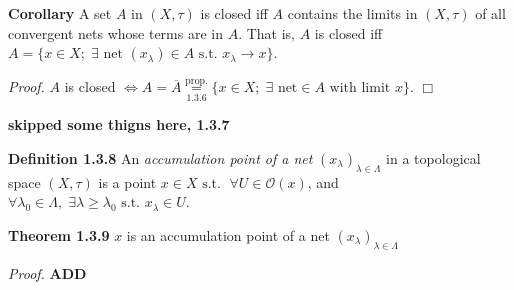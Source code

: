 \documentclass[12pt]{article}
\newcommand{\st}[0]{ \textrm{ s.t. } }
\newcommand{\lrimply}[0] { \Leftrightarrow }
\newcommand{\rarw}[0] { \rightarrow }
\newcommand{\lam}[0] {  \lambda }
\newcommand{\Lam}[0] {  \Lambda }
\newcommand{\curlyO}[0] { \mathcal{O} }
\begin{document}
\begin{flushleft} {\bf Corollary} A set $A$ in $(X, \tau)$ is closed iff $A$ contains the limits in $(X, \tau)$ of all convergent nets whose terms are in $A$. That is, $A$ is closed iff $A = \{ x \in X; \; \exists \textrm{ net } (x_\lambda) \in A \st x_\lambda \rarw x \}$.
\end{flushleft}

\begin{flushleft} \emph{Proof. } $A$ is closed $\lrimply A = \overline{A}  \underset{1.3.6}{\overset{\textrm{prop.} }{=}} \{ x \in X; \; \exists \textrm{ net} \in A \textrm{ with limit } x\} $. $\Box$
\end{flushleft}

{ \bf  skipped some thigns here, 1.3.7 }

\begin{flushleft} {\bf Definition 1.3.8} An \emph{accumulation point of a net} $(x_\lambda)_{\lambda \in \Lambda}$ in a topological space $(X, \tau)$ is a point $x \in X \st \; \forall U \in \curlyO(x)$, and $\forall \lambda_0 \in \Lambda, \; \exists \lambda \ge \lambda_0 \st x_\lambda \in U$.
\end{flushleft}


\begin{flushleft} {\bf Theorem 1.3.9} $x$ is an accumulation point of a net $(x_\lam)_{\lam \in \Lam}$
\end{flushleft}

\begin{flushleft} \emph{Proof. } { \bf ADD }
\end{flushleft}
\end{document}
